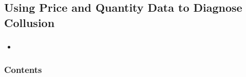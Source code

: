 \documentclass{beamer}
\begin{document}
\subsection{Using Price and Quantity Data to Diagnose Collusion}
\frametitle{}
\begin{frame}
\begin{itemize}
\item 
\end{itemize}
\end{frame}

\begin{frame}[plain]
\frametitle{Contents}
\tableofcontents[hideallsubsections]
\end{frame}
\end{document}
